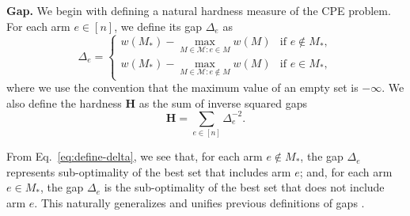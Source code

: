 \documentclass{article}
\newcommand{\Problem}{{CPE}\xspace}
\newcommand{\M}{\mathcal M}
\newcommand{\MultiIdent}{\textsc{TopK}\xspace}
\newcommand{\MultiBandit}{\textsc{MB}\xspace}
\begin{document}
\textbf{Gap.} We begin with defining a natural hardness measure of the \Problem problem. 
For each arm $e \in [n]$, we define its gap $\Delta_e$ as
\begin{equation}
\label{eq:define-delta}
\Delta_e = \begin{cases}
			   w(M_*)-\max_{M\in \M: e\in M} w(M) & \text{if } e\not \in M_*, \\
			   w(M_*)-\max_{M\in \M: e\not \in M} w(M) & \text{if } e\in M_*,
			\end{cases}
\end{equation}
where we use the convention that the maximum value of an empty set is $-\infty$. 
We also define the hardness $\mathbf H$ as the sum of inverse squared gaps 
\begin{equation}
\label{eq:hardness}
\mathbf H =\sum_{e\in [n]} \Delta_e^{-2}.
\end{equation}

From Eq.~\eqref{eq:define-delta}, we see that, for each arm $e\not\in M_*$, the gap $\Delta_e$ represents sub-optimality of the best set that includes arm $e$; and, for each arm $e\in M_*$, the gap $\Delta_e$ is the sub-optimality of the best set that does not include arm $e$.
This naturally generalizes and unifies previous definitions of gaps \citep{audibert2010best,NIPS2011_4478,kalyanakrishnan2010efficient,bubeck2013multiple}.
\end{document}
